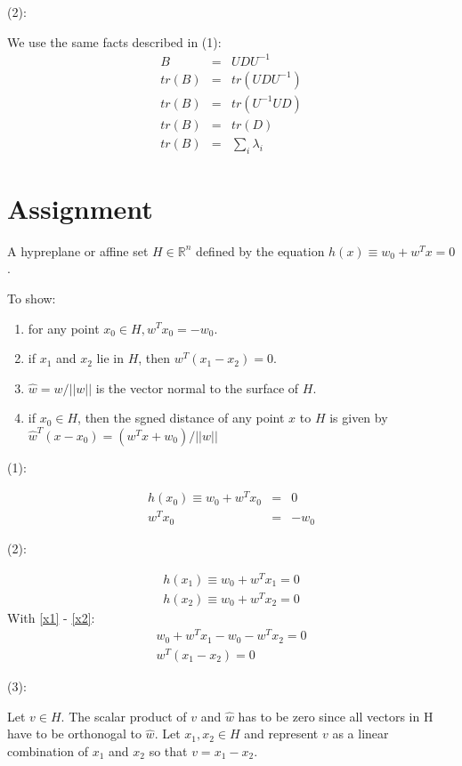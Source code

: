 \documentclass{article}
\begin{document}
(2):

We use the same facts described in (1):
\begin{eqnarray}
B &=& UDU^{-1}\\
tr(B) &=& tr(UDU^{-1})\\
tr(B) &=& tr(U^{-1}UD)\\
tr(B) &=& tr(D)\\
tr(B) &=& \sum_i \lambda_i
\end{eqnarray}

\section{Assignment}		%
A hypreplane or affine set $H \in \mathbb{R}^n$ defined by the equation $h(x) \equiv w_0 + w^Tx = 0$.

To show:
\begin{enumerate}
\item for any point $x_0 \in H, w^Tx_0=-w_0$.
\item if $x_1$ and $x_2$ lie in $H$, then $w^T(x_1-x_2)=0$.
\item $\hat{w}=w/||w||$ is the vector normal to the surface of $H$.
\item if $x_0 \in H$, then the sgned distance of any point $x$ to $H$ is given by $\hat{w}^T(x-x_0) = (w^Tx+w_0)/||w||$
\end{enumerate}  

(1):

\begin{eqnarray}
h(x_0) \equiv w_0 + w^T x_0 &=& 0\\
w^T x_0 &=& -w_0
\end{eqnarray}

(2):

\begin{eqnarray}
h(x_1) \equiv w_0 + w^T x_1 = 0 \label{x1}\\
h(x_2) \equiv w_0 + w^T x_2 = 0 \label{x2}
\end{eqnarray}
With \ref{x1} - \ref{x2}:
\begin{eqnarray}
w_0 + w^Tx_1-w_0-w^Tx_2 = 0\\
w^T(x_1-x_2)=0
\end{eqnarray}

(3):

Let $v \in H$. The scalar product of $v$ and $\hat{w}$ has to be zero since all vectors in H have to be orthonogal to $\hat{w}$. Let $x_1, x_2 \in H$ and represent $v$ as a linear combination of $x_1$ and $x_2$ so that $v = x_1 - x_2$.
\end{document}

